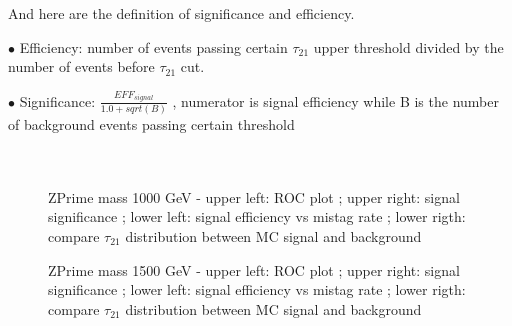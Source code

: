 \documentclass[12pt]{article} %
\begin{document}
And here are the definition of significance and efficiency.

$\bullet$ Efficiency: number of events passing certain $\tau_{21}$ upper threshold divided by the number of events before $\tau_{21}$ cut.

$\bullet$ Significance: $\frac{EFF_{signal}}{1.0+sqrt(B)}$ , numerator is signal efficiency while B is the number of background events passing certain threshold  \\
\\
\\


\begin{figure}[H] %
  \caption{ZPrime mass 1000 GeV - upper left: ROC plot ; upper right: signal significance ; lower left: signal efficiency vs mistag rate ; lower rigth: compare $\tau_{21}$ distribution between MC signal and background}
  \label{fig:tau21_M1000}
\end{figure}

\begin{figure}[H] %
  \caption{ZPrime mass 1500 GeV - upper left: ROC plot ; upper right: signal significance ; lower left: signal efficiency vs mistag rate ; lower rigth: compare $\tau_{21}$ distribution between MC signal and background}
  \label{fig:tau21_M1500}
\end{figure}
\end{document}
